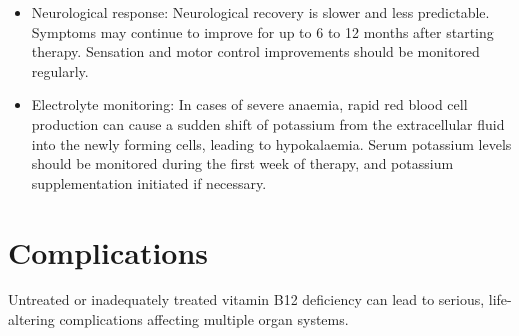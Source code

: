 \begin{itemize}
\begin{itemize}
        \item Neurological response: Neurological recovery is slower and less predictable. Symptoms may continue to improve for up to 6 to 12 months after starting therapy. Sensation and motor control improvements should be monitored regularly.
        \item Electrolyte monitoring: In cases of severe anaemia, rapid red blood cell production can cause a sudden shift of potassium from the extracellular fluid into the newly forming cells, leading to hypokalaemia. Serum potassium levels should be monitored during the first week of therapy, and potassium supplementation initiated if necessary.
    \end{itemize}
\end{itemize}

\section*{Complications}
Untreated or inadequately treated vitamin B12 deficiency can lead to serious, life-altering complications affecting multiple organ systems.

